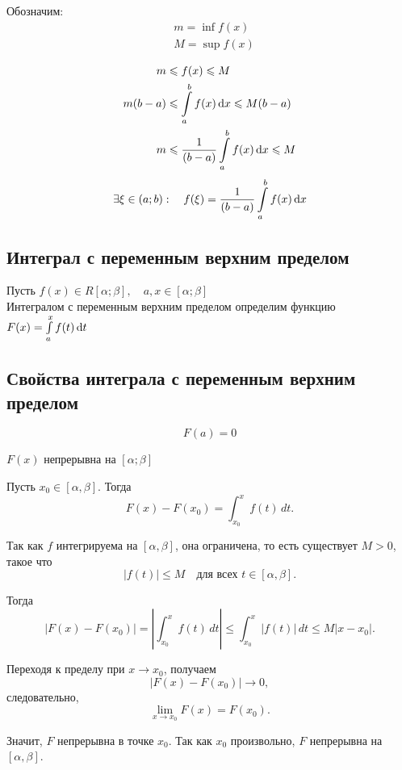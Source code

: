 \begin{Proof}
    Обозначим:\\
    \[
    \begin{aligned}
        &m = \inf f(x)\\
        &M = \sup f(x)\\
    \end{aligned} 
    \]
    \[
    \begin{aligned}
        m &\leqslant f(x) \leqslant M\\
        m(b - a) &\leqslant \int\limits_{a}^{b}{f(x)\mathop{}\!\mathrm{d} x} \leqslant M(b - a)\\
        m &\leqslant \frac{1}{(b - a)}\int\limits_{a}^{b}{f(x)\mathop{}\!\mathrm{d} x} \leqslant M\\
    \end{aligned}
    \]
    \[
    \begin{aligned}
        \exists\xi \in(a; b):\quad f(\xi) = \frac{1}{(b - a)}\int\limits_{a}^{b}{f(x)\mathop{}\!\mathrm{d} x}
    \end{aligned}
    \]
\end{Proof}

\subsection{Интеграл с переменным верхним пределом}
\begin{definition}
    Пусть $f(x) \in R[\alpha; \beta],\quad a, x \in [\alpha; \beta]$\\
    Интегралом с переменным верхним пределом определим функцию $F(x) = \int\limits_{a}^{x}f(t)\mathop{}\!\mathrm{d} t$
\end{definition}


\subsection{Свойства интеграла с переменным верхним пределом}
\begin{remark}
    \[
        F(a) = 0
    \]
\end{remark}

\begin{theorem}
    $F(x)$ непрерывна на $[\alpha; \beta]$
\end{theorem}

\begin{Proof}
    Пусть $x_0 \in [\alpha,\beta]$. Тогда
\[
F(x)-F(x_0)=\int_{x_0}^{x} f(t)\,dt.
\]

Так как $f$ интегрируема на $[\alpha,\beta]$, она ограничена, то есть существует $M>0$, такое что
\[
|f(t)| \le M \quad \text{для всех } t \in [\alpha,\beta].
\]

Тогда
\[
\left|F(x)-F(x_0)\right|
=
\left|\int_{x_0}^{x} f(t)\,dt\right|
\le
\int_{x_0}^{x} |f(t)|\,dt
\le
M|x-x_0|.
\]

Переходя к пределу при $x \to x_0$, получаем
\[
|F(x)-F(x_0)| \to 0,
\]
следовательно,
\[
\lim_{x \to x_0} F(x)=F(x_0).
\]

Значит, $F$ непрерывна в точке $x_0$. Так как $x_0$ произвольно, $F$ непрерывна на $[\alpha,\beta]$.
\end{Proof}

